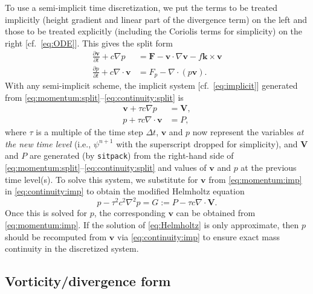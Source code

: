 \documentclass[12pt]{article}
\newcommand{\vecv}{\mathbf{v}}
\newcommand{\vecV}{\mathbf{V}}
\newcommand{\veck}{\mathbf{k}}
\newcommand{\Fmom}{\mathbf{F}}
\newcommand{\Fphi}{F_\p}
\newcommand{\solvec}{\psi}
\newcommand{\p}{{p}}   %
\renewcommand{\P}{{P}} %
\newcommand{\cross}{\times}
\newcommand{\del}{\nabla}
\newcommand{\dt}{\Delta t}
\begin{document}
To use a semi-implicit time discretization, we put the terms to be treated 
implicitly (height gradient and linear part of the divergence term) on the
left and those to be treated explicitly (including the Coriolis terms for
simplicity) on the right [cf.~\eqref{eq:ODE}].  This gives the split form
\begin{align}
   \frac{\partial \vecv}{\partial t} + c\del \p &= 
      \Fmom - \vecv\cdot\del\vecv - f\veck\cross\vecv 
\label{eq:momentum:split}
\\
   \frac{\partial\p}{\partial t} + c\del\cdot\vecv 
      &= \Fphi - \del\cdot(\p\vecv) .
\label{eq:continuity:split}
\end{align}
With any semi-implicit scheme, the implicit system [cf.~\eqref{eq:implicit}]
generated from \eqref{eq:momentum:split}--\eqref{eq:continuity:split} is
\begin{align}
   \vecv + \tau c\del \p &= \vecV ,
\label{eq:momentum:imp}
\\
   \p + \tau c\del\cdot\vecv &= \P ,
\label{eq:continuity:imp}
\end{align}
where $\tau$ is a multiple of the time step $\dt$, $\vecv$ and $\p$ now
represent the variables \emph{at the new time level} (i.e., $\solvec^{n+1}$
with the superscript dropped for simplicity), and $\vecV$ and $\P$ are
generated (by \verb+sitpack+) from the right-hand side of
\eqref{eq:momentum:split}--\eqref{eq:continuity:split} and values of $\vecv$
and $\p$ at the previous time level(s).  To solve this system, we substitute
for $\vecv$ from \eqref{eq:momentum:imp} in \eqref{eq:continuity:imp} to
obtain the modified Helmholtz equation
\begin{equation}
  \p - \tau^2 c^2\del^2 \p = G := \P - \tau c\del\cdot\vecV.
\label{eq:Helmholtz}
\end{equation}
Once this is solved for $\p$, the corresponding $\vecv$ can be obtained from
\eqref{eq:momentum:imp}.  If the solution of \eqref{eq:Helmholtz} is only
approximate, then $\p$ should be recomputed from $\vecv$ via
\eqref{eq:continuity:imp} to ensure exact mass continuity in the discretized
system.

\pagebreak[2]
\subsection{Vorticity/divergence form\label{sec:vd}}
\end{document}
